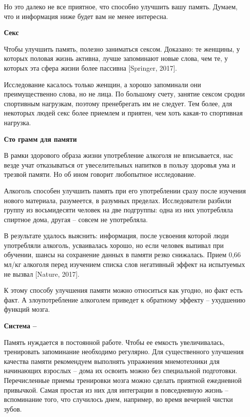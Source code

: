 Но это далеко не все приятное, что способно улучшить вашу память. Думаем, что и информация ниже будет вам не менее интересна.

\textbf{Секс}

Чтобы улучшить память, полезно заниматься сексом. Доказано: те женщины, у которых половая жизнь активна, лучше запоминают новые слова, чем те, у которых эта сфера жизни более пассивна [Springer, 2017].

Исследование касалось только женщин, а хорошо запоминали они преимущественно слова, но не лица. По большому счету, занятие сексом сродни спортивным нагрузкам, поэтому пренебрегать им не следует. Тем более, для некоторых людей секс более приемлем и приятен, чем хоть какая-то спортивная нагрузка.

\textbf{Сто грамм для памяти}

В рамки здорового образа жизни употребление алкоголя не вписывается, нас везде учат отказываться от увеселительных напитков в пользу здоровья ума и трезвой памяти. Но об ином говорит любопытное исследование.

Алкоголь способен улучшить память при его употреблении сразу после изучения нового материала, разумеется, в разумных пределах. Исследователи разбили группу из восьмидесяти человек на две подгруппы: одна из них употребляла спиртное дома, другая – совсем не употребляла.

В результате удалось выяснить: информация, после усвоения которой люди употребляли алкоголь, усваивалась хорошо, но если человек выпивал при обучении, шансы на сохранение данных в памяти резко снижалась. Прием 0,66 мл/кг алкоголя перед изучением списка слов негативный эффект на испытуемых не вызвал [Nature, 2017].

К этому способу улучшения памяти можно относиться как угодно, но факт есть факт. А злоупотребление алкоголем приведет к обратному эффекту – ухудшению функций мозга.

\textbf{Система – }

Память нуждается в постоянной работе. Чтобы ее емкость увеличивалась, тренировать запоминание необходимо регулярно. Для существенного улучшения качества памяти рекомендуем выполнять упражнения мнемотехники для начинающих взрослых – дома их освоить можно без специальной подготовки. Перечисленные приемы тренировки мозга можно сделать приятной ежедневной привычкой. Самая простая из них для интеграции в повседневную жизнь – вспоминание того, что случилось днем, например, во время вечерней чистки зубов.

